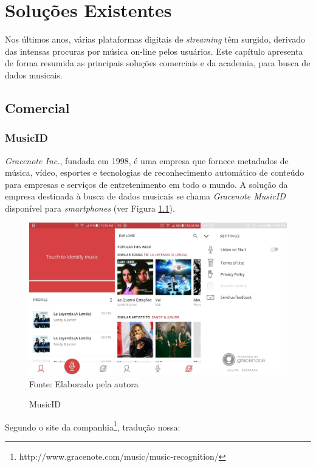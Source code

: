 \chapter{Soluções Existentes} \label{cap:solucoes}
Nos últimos anos, várias plataformas digitais de \textit{streaming} têm surgido, derivado das intensas procuras por música on-line pelos usuários. Este capítulo apresenta de forma resumida as principais soluções comerciais e da academia, para busca de dados musicais.

\section{Comercial} \label{sec:comercial}

\subsection{MusicID} \label{subsec:musicid}
\textit{Gracenote Inc.}, fundada em 1998, é uma empresa que fornece metadados de música, vídeo, esportes e tecnologias de reconhecimento automático de conteúdo para empresas e serviços de entretenimento em todo o mundo. A solução da empresa destinada à busca de dados musicais se chama \textit{Gracenote MusicID\textregistered} disponível para \textit{smartphones} (ver Figura \ref{fig:musicID}).

\begin{figure}[!htb]
   \centering
   \caption{MusicID}\label{fig:musicID} 
   \includegraphics[scale=0.17]{figuras/MusicID.jpg}
   \\Fonte: Elaborado pela autora
\end{figure}

Segundo o site da companhia\footnote{http://www.gracenote.com/music/music-recognition/}, tradução nossa:

